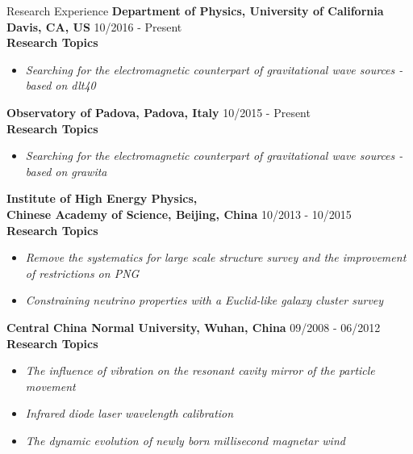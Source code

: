 \documentclass{resume} %
\begin{document}
\begin{rSection}{Research Experience}
       {\textbf{Department of Physics, University of California Davis, CA, US}}  \hfill 10/2016 - Present\\
       {\textbf{Research Topics}}
         \begin{itemize}  \itemsep -2pt %
         \item \textit{Searching for the electromagnetic counterpart of gravitational wave sources - based on dlt40}
         \end{itemize}

       {\textbf{Observatory of Padova, Padova, Italy}}  \hfill 10/2015 - Present\\
       {\textbf{Research Topics}}
         \begin{itemize}  \itemsep -2pt %
         \item \textit{Searching for the electromagnetic counterpart of gravitational wave sources - based on grawita}
         \end{itemize}

       {\textbf{Institute of High Energy Physics, \\Chinese Academy of Science, Beijing, China}} \hfill 10/2013 - 10/2015\\
       {\textbf{Research Topics}}
         \begin{itemize}  \itemsep -2pt %
         \item \textit{Remove the systematics for large scale structure survey and the improvement of restrictions on PNG}
         \item \textit{Constraining neutrino properties with a Euclid-like galaxy cluster survey}
         \end{itemize}

       {\textbf{Central China Normal University, Wuhan, China}} \hfill 09/2008 - 06/2012\\
        {\textbf{Research Topics}}
                 \begin{itemize}  \itemsep -2pt %
                \item \textit{The influence of vibration on the resonant cavity mirror of the particle movement}        
                \item \textit{Infrared diode laser wavelength calibration}              
                \item \textit{The dynamic evolution of newly born millisecond magnetar wind}
                \end{itemize}                
                

\end{rSection}
\end{document}
